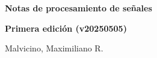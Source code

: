 \begin{center}
    \begin{Huge}
        \textbf{Notas de procesamiento de señales}
    \end{Huge}

    \vspace{1cm}
    \textbf{Primera edición (v20250505)}
    \vspace{2cm}

    \begin{Large}
        Malvicino, Maximiliano R.
    \end{Large}
\end{center}
